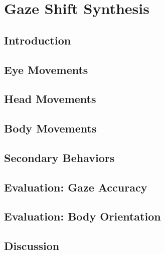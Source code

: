 \pagestyle{deposit}

\chapter{Gaze Shift Synthesis}
\label{cha:GazeShiftModel}

\section{Introduction}
\label{sec:GazeShiftModelIntro}
%

\section{Eye Movements}
\label{sec:EyeModel}
%

\section{Head Movements}
\label{sec:HeadModel}
%

\section{Body Movements}
\label{sec:BodyModel}
%

\section{Secondary Behaviors}
\label{sec:SecondaryBehaviors}
%

\section{Evaluation: Gaze Accuracy}
\label{sec:GazeShiftModelEval1}
%

\section{Evaluation: Body Orientation}
\label{sec:GazeShiftModelEval2}
%

\section{Discussion}
\label{sec:GazeShiftModelDiscussion}
%
